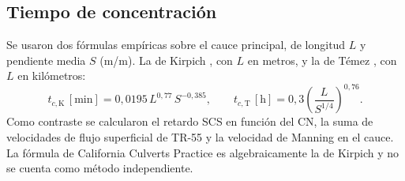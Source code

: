 \documentclass{sosg-informe}
\begin{document}
\subsection{Tiempo de concentración}
Se usaron dos fórmulas empíricas sobre el cauce principal, de longitud $L$ y pendiente media $S$ (m/m). La de Kirpich \citep{kirpich1940}, con $L$ en metros, y la de Témez \citep{temez1978}, con $L$ en kilómetros:
\begin{equation}
  t_{c,\mathrm{K}}\,[\mathrm{min}] = 0,0195\, L^{0,77}\, S^{-0,385},
  \qquad
  t_{c,\mathrm{T}}\,[\mathrm{h}] = 0,3 \left(\frac{L}{S^{1/4}}\right)^{0,76}.
  \label{eq:tc}
\end{equation}
Como contraste se calcularon el retardo SCS en función del CN, la suma de velocidades de flujo superficial de TR-55 \citep{usda1986} y la velocidad de Manning en el cauce. La fórmula de California Culverts Practice es algebraicamente la de Kirpich y no se cuenta como método independiente.
\end{document}
